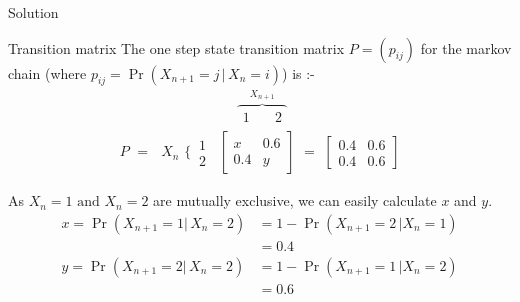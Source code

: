 \documentclass{beamer}
\providecommand{\pr}[1]{\ensuremath{\Pr\left(#1\right)}}
\begin{document}
\begin{frame}{Solution}
\begin{block}{Transition matrix}
The one step state transition matrix $P=(p_{ij})$ for the markov chain (where $p_{ij}=\pr{X_{n+1}=j\, |\, X_{n}=i}$) is :-
\begin{align}
\,\,\overbrace{
 \begin{matrix}
1 & \,\,\,\,\,\,2
\end{matrix}\nonumber}^{X_{n+1}}\nonumber
\end{align}
\vspace{-1cm}
\begin{align}
P\,\,=\,\,\,\,\scriptstyle{X_n\,\,} \bigg\{ \, \begin{matrix} 1\\ 2 \end{matrix}\,\,\,
 \begin{bmatrix}
x & 0.6 \\
0.4 & y 
\end{bmatrix}\,\,=\,\,
\begin{bmatrix}
0.4 & 0.6 \\
0.4 & 0.6 
\end{bmatrix}
\end{align}
\end{block}
As $X_n=1 \text{ and } X_n=2$ are mutually exclusive, we can easily calculate $x$ and $y$.
\begin{align}
   x=\pr{X_{n+1} = 1 |\, X_{n}=2} &= 1-\pr{X_{n+1} = 2 \,| X_{n}=1}\nonumber
    \\&= 0.4 \label{x}\\
    y=\pr{X_{n+1} = 2 |\, X_{n}=2} &= 1-\pr{X_{n+1} = 1 \,| X_{n}=2}\nonumber
    \\&= 0.6 \label{y}
\end{align}
\end{frame}
\end{document}
